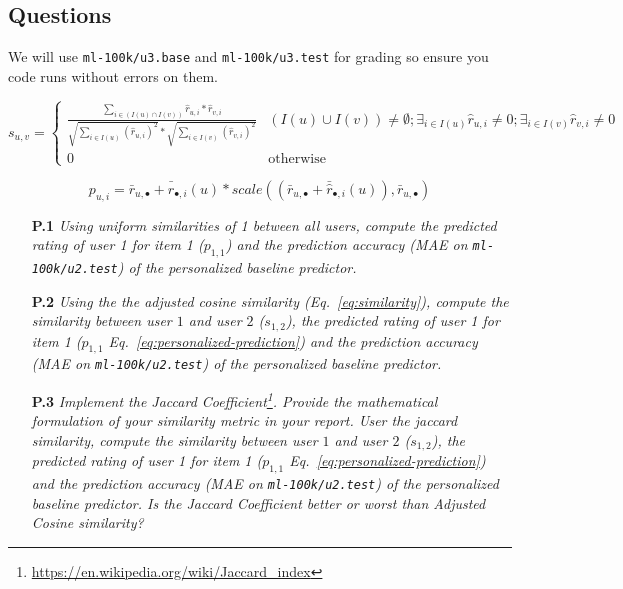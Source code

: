 \documentclass{article}
\begin{document}
\subsection{Questions}
\label{section:q1}

We will use  \texttt{ml-100k/u3.base} and  \texttt{ml-100k/u3.test} for grading so ensure you code runs without errors on them.

\begin{equation}
    \label{eq:similarity}
    s_{u,v} = \begin{cases}
                   \frac{\sum_{i \in (I(u) \cap I(v))} \hat r_{u,i} * \hat r_{v,i}}
                         { \sqrt{\sum_{i \in I(u)} {(\hat r_{u,i})}^{2}} * \sqrt{\sum_{i \in I(v)} {(\hat r_{v,i})}^{2}}} &
                                    (I(u) \cup I(v)) \neq \emptyset;
                                \exists_{i \in I(u)} \hat r_{u,i} \neq 0; 
                                 \exists_{i \in I(v)} \hat r_{v,i} \neq 0 \\
                         0 & \text{otherwise}
                    \end{cases}
\end{equation}


\begin{equation}
    \label{eq:personalized-prediction}
    p_{u,i} = \bar r_{u,\bullet} + \bar{\hat r}_{\bullet,i}(u) * scale( (\bar r_{u,\bullet} + \bar{\hat r}_{\bullet,i}(u)), \bar r_{u,\bullet})
\end{equation}

  
\begin{itemize}
    \item [\textbf{P.1}] \textit{Using uniform similarities of 1 between all users, compute the predicted rating of user 1 for item 1 ($p_{1,1}$) and the prediction accuracy (MAE on \texttt{ml-100k/u2.test}) of the personalized baseline predictor.} 
    
    \item [\textbf{P.2}] \textit{Using the the adjusted cosine similarity (Eq.~\ref{eq:similarity}), compute the similarity between user $1$ and user $2$ ($s_{1,2}$), the predicted rating of user 1 for item 1 ($p_{1,1}$ Eq.~\ref{eq:personalized-prediction}) and the prediction accuracy (MAE on \texttt{ml-100k/u2.test}) of the personalized baseline predictor.} 
    
        \item [\textbf{P.3}] \textit{Implement the Jaccard Coefficient\footnote{\url{https://en.wikipedia.org/wiki/Jaccard_index}}. Provide the mathematical formulation of your similarity metric in your report. User the jaccard similarity, compute the similarity between user $1$ and user $2$ ($s_{1,2}$), the predicted rating of user 1 for item 1 ($p_{1,1}$ Eq.~\ref{eq:personalized-prediction}) and the prediction accuracy (MAE on \texttt{ml-100k/u2.test}) of the personalized baseline predictor. Is the Jaccard Coefficient better or worst than Adjusted Cosine similarity?}
\end{itemize}
\end{document}
